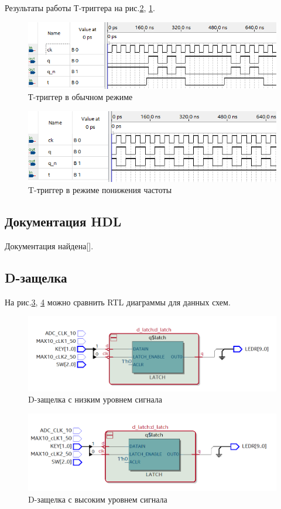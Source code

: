 \documentclass[a4paper,14pt]{article}
\begin{document}
Результаты работы Т-триггера на рис.\ref{fig:t_wave2}, \ref{fig:t_wave_sync}.
\begin{figure}[H]
	\centering
	\includegraphics[width=0.7\linewidth]{imgs/t_wave_sync}
	\caption{Т-триггер в обычном режиме}
	\label{fig:t_wave_sync}
\end{figure}

\begin{figure}[H]
	\centering
	\includegraphics[width=0.7\linewidth]{imgs/t_wave2}
	\caption{T-триггер в режиме понижения частоты}
	\label{fig:t_wave2}
\end{figure}

\subsection{Документация HDL}

Документация найдена[\cite{citekey}].

\subsection{D-защелка}


На рис.\ref{fig:4_RTL_norm}, \ref{fig:4_RTL_inv} можно сравнить RTL диаграммы для данных схем.

\begin{figure}[H]
	\centering
	\includegraphics[width=0.7\linewidth]{imgs/4_RTL_norm}
	\caption{D-защелка с низким уровнем сигнала}
	\label{fig:4_RTL_norm}
\end{figure}

\begin{figure}[H]
	\centering
	\includegraphics[width=0.7\linewidth]{imgs/4_RTL_inv}
	\caption{D-защелка с высоким уровнем сигнала}
	\label{fig:4_RTL_inv}
\end{figure}
\end{document}
